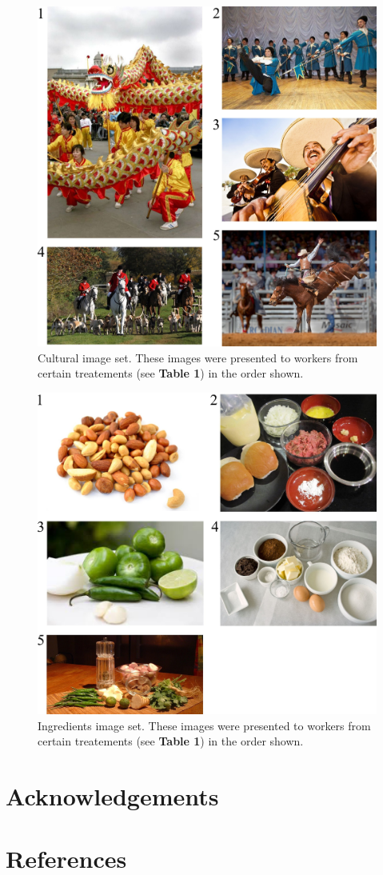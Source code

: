\documentclass[a4paper]{report}
\begin{document}
\begin{figure}
	\includegraphics[scale=1.00]{figs/taskImages/cultural.jpg}
	\caption{Cultural image set. These images were presented to workers from 
		certain treatements (see \textbf{Table 1}) in the order shown.}
\end{figure}

\begin{figure}
	\includegraphics[scale=1.00]{figs/taskImages/ingredients.jpg}
	\caption{ Ingredients image set. These images were presented to workers 
		from certain treatements (see \textbf{Table 1}) in the order shown.}
\end{figure}
\section*{Acknowledgements}
\section*{References}
\begingroup
\renewcommand{\chapter}[2]{}

\endgroup
 
\end{document}
